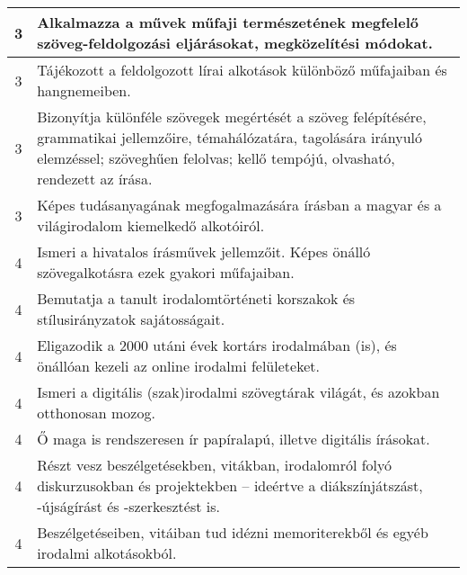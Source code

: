 \begin{longtable}{c | p{} }
                                
                                          3 &  Alkalmazza a művek műfaji természetének megfelelő szöveg-feldolgozási eljárásokat, megközelítési módokat. \\ \hline
                                          3 &  Tájékozott a feldolgozott lírai alkotások különböző műfajaiban és hangnemeiben. \\ \hline
                                          3 &  Bizonyítja különféle szövegek megértését a szöveg felépítésére, grammatikai jellemzőire, témahálózatára, tagolására irányuló elemzéssel; szöveghűen felolvas; kellő tempójú, olvasható, rendezett az írása.  \\ \hline
                                          3 &  Képes tudásanyagának megfogalmazására írásban a magyar és a világirodalom kiemelkedő alkotóiról. \\ \hline
                                      
                                
                                          4 &  Ismeri a hivatalos írásművek jellemzőit. Képes önálló szövegalkotásra ezek gyakori műfajaiban. \\ \hline
                                          4 &  Bemutatja a tanult irodalomtörténeti korszakok és stílusirányzatok sajátosságait. \\ \hline
                                          4 &  Eligazodik a 2000 utáni évek kortárs irodalmában (is), és önállóan kezeli az online irodalmi felületeket. \\ \hline
                                          4 &  Ismeri a digitális (szak)irodalmi szövegtárak világát, és azokban otthonosan mozog. \\ \hline
                                          4 &  Ő maga is rendszeresen ír papíralapú, illetve digitális írásokat. \\ \hline
                                          4 &  Részt vesz beszélgetésekben, vitákban, irodalomról folyó diskurzusokban és projektekben – ideértve a diákszínjátszást, -újságírást és -szerkesztést is. \\ \hline
                                          4 &  Beszélgetéseiben, vitáiban tud idézni memoriterekből és egyéb irodalmi alkotásokból. \\ \hline
                                      
                        \end{longtable}
            \clearpage

